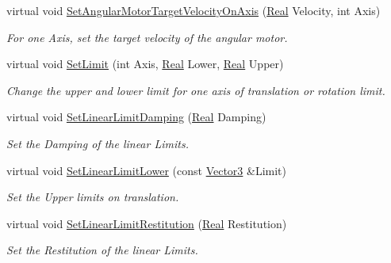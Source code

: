 \begin{DoxyCompactItemize}
virtual void \hyperlink{classphys_1_1Generic6DofConstraint_a16623a2a275eca9038f47e9e933c594c}{SetAngularMotorTargetVelocityOnAxis} (\hyperlink{namespacephys_af7eb897198d265b8e868f45240230d5f}{Real} Velocity, int Axis)
\begin{DoxyCompactList}\small\item\em For one Axis, set the target velocity of the angular motor. \item\end{DoxyCompactList}\item 
virtual void \hyperlink{classphys_1_1Generic6DofConstraint_ad13819206ae8608c863ff3a137feb11f}{SetLimit} (int Axis, \hyperlink{namespacephys_af7eb897198d265b8e868f45240230d5f}{Real} Lower, \hyperlink{namespacephys_af7eb897198d265b8e868f45240230d5f}{Real} Upper)
\begin{DoxyCompactList}\small\item\em Change the upper and lower limit for one axis of translation or rotation limit. \item\end{DoxyCompactList}\item 
virtual void \hyperlink{classphys_1_1Generic6DofConstraint_a91eed672af7fb8aa98f442fec1104ced}{SetLinearLimitDamping} (\hyperlink{namespacephys_af7eb897198d265b8e868f45240230d5f}{Real} Damping)
\begin{DoxyCompactList}\small\item\em Set the Damping of the linear Limits. \item\end{DoxyCompactList}\item 
virtual void \hyperlink{classphys_1_1Generic6DofConstraint_ab5b5d63200ce82ade149e8977e34a044}{SetLinearLimitLower} (const \hyperlink{classphys_1_1Vector3}{Vector3} \&Limit)
\begin{DoxyCompactList}\small\item\em Set the Upper limits on translation. \item\end{DoxyCompactList}\item 
virtual void \hyperlink{classphys_1_1Generic6DofConstraint_a79c4de82f5af325038eba9c774c98a96}{SetLinearLimitRestitution} (\hyperlink{namespacephys_af7eb897198d265b8e868f45240230d5f}{Real} Restitution)
\begin{DoxyCompactList}\small\item\em Set the Restitution of the linear Limits. \item\end{DoxyCompactList}\item 

\end{DoxyCompactItemize}

